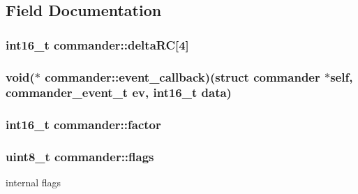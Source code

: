 \subsection{Field Documentation}
\hypertarget{structcommander_abaa62c2bf4b77172cde393e2704635fc}{
\subsubsection[{delta\+R\+C}]{\setlength{\rightskip}{0pt plus 5cm}int16\+\_\+t commander\+::delta\+R\+C\mbox{[}4\mbox{]}}}\label{structcommander_abaa62c2bf4b77172cde393e2704635fc}
\hypertarget{structcommander_a728bf75ac58c4031e3005ea4abe61cc3}{
\subsubsection[{event\+\_\+callback}]{\setlength{\rightskip}{0pt plus 5cm}void($\ast$ commander\+::event\+\_\+callback)(struct {\bf commander} $\ast$self, {\bf commander\+\_\+event\+\_\+t} ev, int16\+\_\+t data)}}\label{structcommander_a728bf75ac58c4031e3005ea4abe61cc3}
\hypertarget{structcommander_a4699ec2e2ef438235b39c79b6f1e3404}{
\subsubsection[{factor}]{\setlength{\rightskip}{0pt plus 5cm}int16\+\_\+t commander\+::factor}}\label{structcommander_a4699ec2e2ef438235b39c79b6f1e3404}
\hypertarget{structcommander_a24959e28d9524c801a34ddda56c21502}{
\subsubsection[{flags}]{\setlength{\rightskip}{0pt plus 5cm}uint8\+\_\+t commander\+::flags}}\label{structcommander_a24959e28d9524c801a34ddda56c21502}


internal flags 

